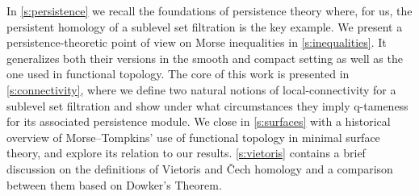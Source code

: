 In \cref{s:persistence} we recall the foundations of persistence theory where, for us, the persistent homology of a sublevel set filtration is the key example.
We present a persistence-theoretic point of view on Morse inequalities in \cref{s:inequalities}.
It generalizes both their versions in the smooth and compact setting as well as the one used in functional topology.
The core of this work is presented in \cref{s:connectivity}, where we define two natural notions of local-connectivity for a sublevel set filtration and show under what circumstances they imply q-tameness for its associated persistence module.
We close in \cref{s:surfaces} with a historical overview of Morse--Tompkins' use of functional topology in minimal surface theory, and explore its relation to our results.
\cref{s:vietoris} contains a brief discussion on the definitions of Vietoris and \v{C}ech homology and a comparison between them based on Dowker's Theorem.